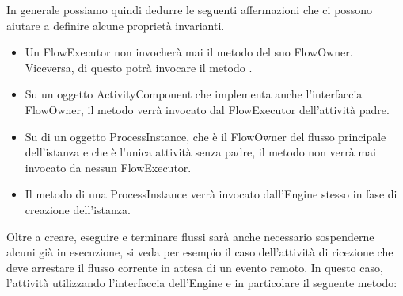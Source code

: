 

In generale possiamo quindi dedurre le seguenti affermazioni che ci possono
aiutare a definire alcune proprietà invarianti.

\begin{itemize}
  \item Un FlowExecutor non invocherà mai il metodo  del suo
  FlowOwner. Viceversa, di questo potrà invocare il metodo
  .
  
  \item Su un oggetto ActivityComponent che implementa anche l'interfaccia
  FlowOwner, il metodo  verrà invocato dal FlowExecutor
  dell'attività padre.
  
  \item Su di un oggetto ProcessInstance, che \`e il FlowOwner del flusso
  principale dell'istanza e che \`e l'unica attività senza padre, 
  il metodo  non verrà mai invocato da nessun FlowExecutor.
  
  \item Il metodo  di una ProcessInstance verrà invocato
  dall'Engine stesso in fase di creazione dell'istanza.
  
\end{itemize}

Oltre a creare, eseguire e terminare flussi sarà anche necessario sospenderne
alcuni già in esecuzione, si veda per esempio il caso dell'attività di ricezione
che deve arrestare il flusso corrente in attesa di un evento remoto. In questo
caso, l'attività utilizzando l'interfaccia dell'Engine e in particolare il
seguente metodo:

